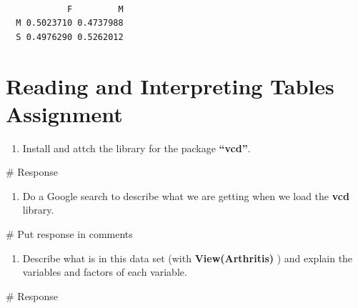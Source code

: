 \documentclass[
  letterpaper,
  DIV=11,
  numbers=noendperiod]{scrreprt}
\newenvironment{Shaded}{\begin{snugshade}}{\end{snugshade}}
\newcommand{\CommentTok}[1]{\textcolor[rgb]{0.37,0.37,0.37}{#1}}
\providecommand{\tightlist}{%
  \setlength{\itemsep}{0pt}\setlength{\parskip}{0pt}}\usepackage{longtable,booktabs,array}
\begin{document}
\begin{verbatim}
   
            F         M
  M 0.5023710 0.4737988
  S 0.4976290 0.5262012
\end{verbatim}


\chapter*{Reading and Interpreting Tables
Assignment}\label{reading-and-interpreting-tables-assignment}


\begin{enumerate}
\def\labelenumi{\arabic{enumi}.}
\tightlist
\item
  Install and attch the library for the package \textbf{``vcd''}.
\end{enumerate}

\begin{Shaded}
\begin{Highlighting}[]
\CommentTok{\# Response}
\end{Highlighting}
\end{Shaded}

\begin{enumerate}
\def\labelenumi{\arabic{enumi}.}
\setcounter{enumi}{1}
\tightlist
\item
  Do a Google search to describe what we are getting when we load the
  \textbf{vcd} library.
\end{enumerate}

\begin{Shaded}
\begin{Highlighting}[]
\CommentTok{\# Put response in comments}
\end{Highlighting}
\end{Shaded}

\begin{enumerate}
\def\labelenumi{\arabic{enumi}.}
\setcounter{enumi}{2}
\tightlist
\item
  Describe what is in this data set (with \textbf{View(Arthritis)} ) and
  explain the variables and factors of each variable.
\end{enumerate}

\begin{Shaded}
\begin{Highlighting}[]
\CommentTok{\# Response}
\end{Highlighting}
\end{Shaded}
\end{document}
